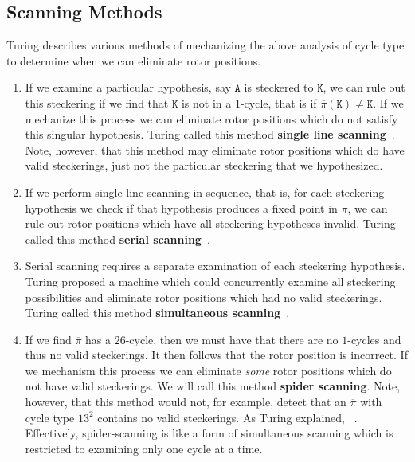 \subsection{Scanning Methods}
Turing describes various methods of mechanizing the above analysis of
cycle type to determine when we can eliminate rotor positions.
\begin{enumerate}
  \item If we examine a particular hypothesis, say $\texttt{A}$ is steckered
    to $\texttt{K}$, we can rule out this steckering if we find that
    $\texttt{K}$ is
    not in a $1$-cycle, that is if $\overline\pi(\texttt{K}) \ne
    \texttt{K}$. If we
    mechanize this process we can eliminate rotor positions which do
    not satisfy this singular hypothesis. Turing called this method
    \textbf{single line scanning}~\cite[p.~104]{Turing1940ProfBook}. Note, however, that this method
    may eliminate rotor
    positions which do have valid steckerings, just not the
    particular steckering that we hypothesized.
  \item If we perform single line scanning in sequence, that is, for
    each steckering hypothesis we check if that hypothesis produces a
    fixed point in $\overline\pi$, we can rule out rotor positions which
    have all steckering hypotheses invalid. Turing called this method
    \textbf{serial scanning}~\cite[p.~104]{Turing1940ProfBook}.
  \item Serial scanning requires a separate examination of each
    steckering hypothesis. Turing proposed a machine which could concurrently
    examine all steckering possibilities and eliminate rotor positions
    which had no valid steckerings. Turing called this method
    \textbf{simultaneous scanning}~\cite[p.~104]{Turing1940ProfBook}.
  \item If we find $\overline\pi$ has a $26$-cycle, then we must
    have that there are no $1$-cycles and thus no valid steckerings.
    It then follows that the rotor position is incorrect.
    If we mechanism this process we can eliminate \emph{some} rotor
    positions which do not have valid steckerings. We will call this
    method \textbf{spider scanning}. Note, however, that this method
    would not, for example, detect that an $\overline\pi$ with cycle
    type ${13}^2$ contains no
    valid steckerings. As Turing explained,
    ~\cite[p.~112]{Turing1940ProfBook}. Effectively, spider-scanning is like a form of
    simultaneous scanning which is restricted
    to examining only one cycle at a time.
\end{enumerate}
